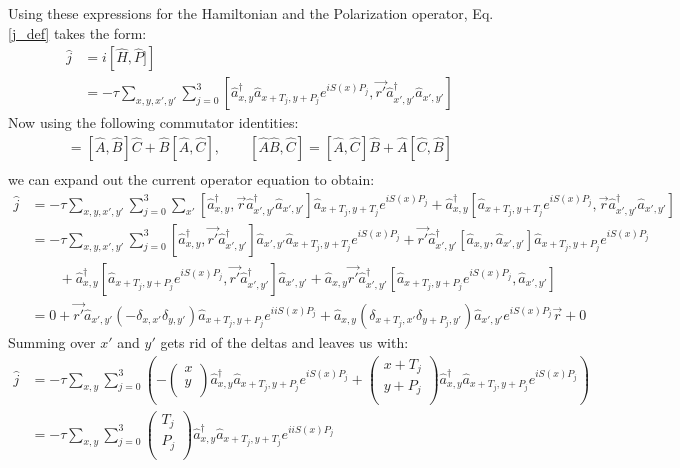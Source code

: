 \documentclass[12pt]{article}
\begin{document}
Using these expressions for the Hamiltonian and the Polarization operator, Eq. \eqref{j_def} takes the form:
\begin{align}
\hat{j} & = i\left[\hat{H}, \hat{P}]\right]\\
		& = -\tau \sum_{x,y,x',y'} \sum_{j=0}^3\left[\hat{a}^\dagger_{x,y} \hat{a}_{x+T_j, y+P_j} e^{i S(x) P_j},  \vec{r'} \hat{a}^\dagger_{x',y'} \hat{a}_{x',y'}\right] 
\end{align}
Now using the following commutator identities:
\begin{align}
[\hat{A}, \hat{B}\hat{C}] = [\hat{A},\hat{B}]\hat{C} + \hat{B}[\hat{A},\hat{C}], \qquad [\hat{A} \hat{B},\hat{C}] = [\hat{A},\hat{C}]\hat{B} + \hat{A}[\hat{C},\hat{B}]\\
\end{align}
we can expand out the current operator equation to obtain:
\begin{align}
	\hat{j}	& =  -\tau \sum_{x,y,x',y'} \sum_{j=0}^3\sum_{x'}  [\hat{a}^\dagger_{x,y},\vec{r}\hat{a}^\dagger_{x',y'}\hat{a}_{x',y'}]\hat{a}_{x+T_j, y+T_j} e^{ i S(x) P_j}+\hat{a}^\dagger_{x,y}[\hat{a}_{x+T_j, y+T_j} e^{i S(x) P_j},\vec{r}\hat{a}^\dagger_{x',y'}\hat{a}_{x',y'} ] \\     
	& =  -\tau \sum_{x,y,x',y'} \sum_{j=0}^3[ \hat{a}^\dagger_{x,y} ,\vec{r'}\hat{a}^\dagger_{x',y'}]\hat{a}_{x',y'} \hat{a}_{x+T_j, y+T_j} e^{i S(x) P_j}+ \vec{r'}\hat{a}^\dagger_{x',y'}[ \hat{a}_{x,y} , \hat{a}_{x',y'}] \hat{a}_{x+T_j, y+P_j} e^{i S(x) P_j}\\
	&\qquad +\hat{a}^\dagger_{x,y}[ \hat{a}_{x+T_j, y+P_j} e^{ i S(x) P_j},\vec{r'}\hat{a}^\dagger_{x',y'}]\hat{a}_{x',y'} +\hat{a}_{x,y}\vec{r'} \hat{a}^\dagger_{x',y'}[ \hat{a}_{x+T_j, y+P_j} e^{i S(x) P_j},  \hat{a}_{x',y'}] \\
	& = 0 + \vec{r'}\hat{a}_{x',y'}(-\delta_{x,x'}\delta_{y,y'}) \hat{a}_{x+T_j, y+P_j} e^{i i S(x) P_j}+\hat{a}_{x,y}(\delta_{x+T_j,x'} \delta_{y+P_j,y'}) \hat{a}_{x',y'} e^{i S(x) P_j} \vec{r} +0
\end{align}
Summing over $x'$ and $y'$ gets rid of the deltas and leaves us with:
\begin{align}
 \hat{j} & =-\tau \sum_{x,y} \sum_{j=0}^3 \left( -
 \begin{pmatrix}
 	x \\
	y \\
	\end{pmatrix}
\hat{a}_{x,y}^\dagger \hat{a}_{x+T_j, y+P_j} e^{i S(x) P_j}+
 \begin{pmatrix}
 	x+T_j \\
	y +P_j\\
	\end{pmatrix}
\hat{a}_{x,y}^\dagger \hat{a}_{x+T_j, y+P_j} e^{i S(x) P_j}\right)\\
		&= -\tau \sum_{x,y} \sum_{j=0}^3 
		\begin{pmatrix}
			T_j \\
			P_j\\
		\end{pmatrix}\hat{a}_{x,y}^\dagger\hat{a}_{x+T_j, y+T_j} e^{i i S(x) P_j} 
\end{align}
\end{document}
